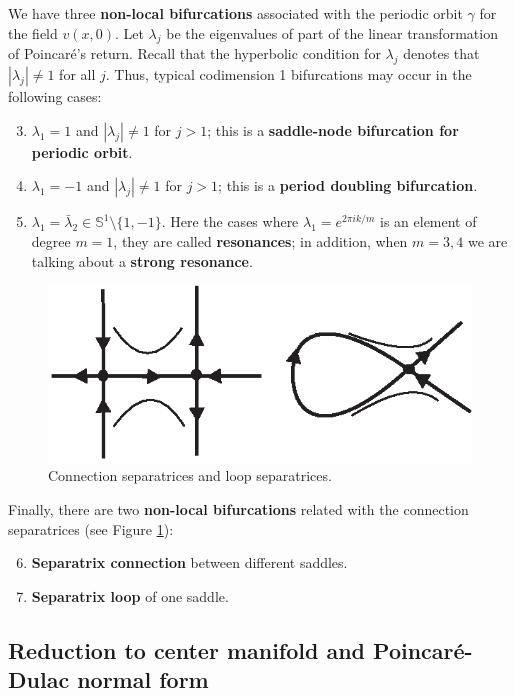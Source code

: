 We have three \textbf{non-local bifurcations} associated with the periodic orbit $\gamma$ for the field $v (x, 0)$. Let $\lambda _{j}$ be the eigenvalues of part of the linear transformation of Poincaré's return. Recall that the hyperbolic condition for $\lambda _{j}$ denotes that $\left\vert \lambda _{j}\right\vert \not=1$ for all $j$. Thus, typical codimension 1 bifurcations may occur in the following cases:
\begin{enumerate}\setcounter{enumi}{2}
	\item $\lambda _{1}=1$ and $\left\vert \lambda _{j}\right\vert \not=1$
	for $j>1$; this is a \textbf{saddle-node bifurcation for periodic orbit}.
	\item $\lambda _{1}=-1$ and $\left\vert \lambda _{j}\right\vert \not=1$
	for $j>1$; this is a \textbf{period doubling bifurcation}.
	\item $\lambda _{1}=\bar{\lambda}_{2}\in \mathbb{S}^{1}\setminus
	\{1,-1\}$. Here the cases where $\lambda _{1}=e^{2\pi ik/m}$ is an element of degree $m=1$, they are called \textbf{resonances}; in addition, when $m = 3, 4$ we are talking about a \textbf{strong resonance}.
\end{enumerate}

\begin{figure}[!ht]
	\centering
	\includegraphics [scale=1.4]{jtr310}
	\caption{Connection separatrices and loop separatrices.}
	\label{fig:3.10}
\end{figure}

Finally, there are two \textbf{non-local bifurcations} related with the connection separatrices (see Figure \ref{fig:3.10}):
\begin{enumerate}\setcounter{enumi}{5}
	\item \textbf{Separatrix connection} between different saddles.
	\item \textbf{Separatrix loop} of one saddle.
\end{enumerate}

\subsection{Reduction to center manifold and Poincaré-Dulac normal form} \label{subsec:3.3.1}

